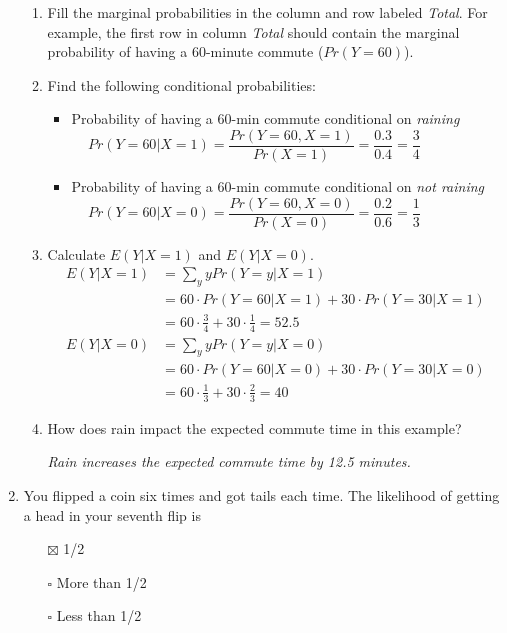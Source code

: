 \documentclass{./../../Latex/handout}
\begin{document}
\begin{enumerate}
\begin{enumerate}
  \item Fill the marginal probabilities in the column and row labeled \textit{Total}. For example, the first row in column \textit{Total} should contain the marginal probability of having a 60-minute commute ($Pr(Y=60)$). \\
  \item Find the following conditional probabilities: \vspace{0.5em}
  \begin{itemize}
 \item Probability of having a 60-min commute conditional on \textit{raining} \vspace{0.25cm}
 $$ Pr(Y=60| X=1)  = \frac{Pr(Y=60, X=1)}{Pr(X=1)} = \frac{0.3}{0.4} = \frac{3}{4} \hspace{2cm} $$ \vspace{0.25em}
  \item Probability of having a 60-min commute conditional on \textit{not raining} \vspace{0.25cm}
   $$ Pr(Y=60| X=0) = \frac{Pr(Y=60, X=0)}{Pr(X=0)} = \frac{0.2}{0.6} = \frac{1}{3} \hspace{2cm} $$ \vspace{0.25em}
\end{itemize}
\item Calculate $E(Y| X=1)$ and $E(Y| X=0)$. 
\begin{align*}
	E(Y| X=1) &= \sum_{y} y Pr(Y=y| X=1) \\
	&= 60 \cdot Pr(Y=60| X=1) + 30 \cdot Pr(Y=30| X=1) \\
	&= 60 \cdot \frac{3}{4} + 30 \cdot \frac{1}{4} = 52.5
\end{align*}  
\begin{align*}
	E(Y| X=0) &= \sum_{y} y Pr(Y=y| X=0) \\
	&= 60 \cdot Pr(Y=60| X=0) + 30 \cdot Pr(Y=30| X=0) \\
	&= 60 \cdot \frac{1}{3} + 30 \cdot \frac{2}{3} = 40
\end{align*}  \item How does rain impact the expected commute time in this example? \item[] \textit{Rain increases the expected commute time by 12.5 minutes. }
\end{enumerate}

\item You flipped a coin six times and got tails each time. The likelihood of getting a head in your seventh flip is
\begin{enumerate}
\item[$\boxtimes$] 1/2
\item[$\square$] More than 1/2
\item[$\square$] Less than 1/2 \\~\\
\end{enumerate}


\end{enumerate}
\end{document}
